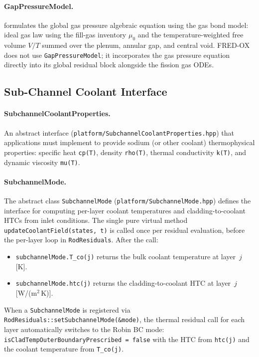 \documentclass[11pt,a4paper]{article}
\begin{document}
\paragraph{GapPressureModel.}
 formulates the global gas pressure algebraic equation using the gas bond model: ideal gas law using the fill-gas inventory $\mu_0$ and the temperature-weighted free volume $V/T$ summed over the plenum, annular gap, and central void.
FRED-OX does not use \texttt{GapPressureModel}; it incorporates the gas pressure equation directly into its global residual block alongside the fission gas ODEs.

\subsection{Sub-Channel Coolant Interface}
\label{sec:subchannel_plat}

\paragraph{SubchannelCoolantProperties.}
An abstract interface (\texttt{platform/SubchannelCoolantProperties.hpp}) that applications must implement to provide sodium (or other coolant) thermophysical properties: specific heat \texttt{cp(T)}, density \texttt{rho(T)}, thermal conductivity \texttt{k(T)}, and dynamic viscosity \texttt{mu(T)}.

\paragraph{SubchannelMode.}
The abstract class \texttt{SubchannelMode} (\texttt{platform/SubchannelMode.hpp}) defines the interface for computing per-layer coolant temperatures and cladding-to-coolant HTCs from inlet conditions.  The single pure virtual method \texttt{updateCoolantField(states, t)} is called once per residual evaluation, before the per-layer loop in \texttt{RodResiduals}.  After the call:
\begin{itemize}
  \item \texttt{subchannelMode.T\_co(j)} returns the bulk coolant temperature at layer~$j$ [K].
  \item \texttt{subchannelMode.htc(j)} returns the cladding-to-coolant HTC at layer~$j$ [W/(m$^2$\,K)].
\end{itemize}
When a \texttt{SubchannelMode} is registered via \texttt{RodResiduals::setSubchannelMode(\&mode)}, the thermal residual call for each layer automatically switches to the Robin BC mode: \texttt{isCladTempOuterBoundaryPrescribed = false} with the HTC from \texttt{htc(j)} and the coolant temperature from \texttt{T\_co(j)}.
\end{document}

